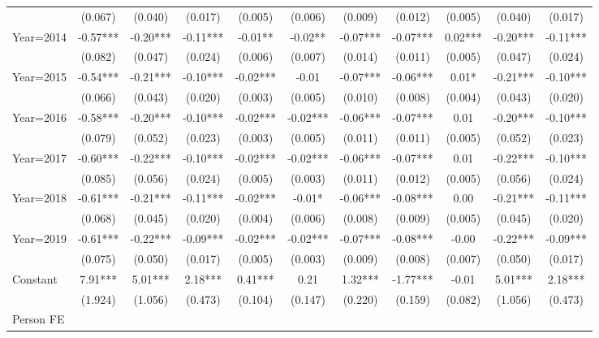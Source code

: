 {\begin{tabular}{l*{10}{c}}
                    &(0.067)   &(0.040)   &(0.017)   &(0.005)   &(0.006)   &(0.009)   &(0.012)   &(0.005)   &(0.040)   &(0.017)   \\
Year=2014           & -0.57***& -0.20***& -0.11***& -0.01** & -0.02** & -0.07***& -0.07***&  0.02***& -0.20***& -0.11***\\
                    &(0.082)   &(0.047)   &(0.024)   &(0.006)   &(0.007)   &(0.014)   &(0.011)   &(0.005)   &(0.047)   &(0.024)   \\
Year=2015           & -0.54***& -0.21***& -0.10***& -0.02***& -0.01   & -0.07***& -0.06***&  0.01*  & -0.21***& -0.10***\\
                    &(0.066)   &(0.043)   &(0.020)   &(0.003)   &(0.005)   &(0.010)   &(0.008)   &(0.004)   &(0.043)   &(0.020)   \\
Year=2016           & -0.58***& -0.20***& -0.10***& -0.02***& -0.02***& -0.06***& -0.07***&  0.01   & -0.20***& -0.10***\\
                    &(0.079)   &(0.052)   &(0.023)   &(0.003)   &(0.005)   &(0.011)   &(0.011)   &(0.005)   &(0.052)   &(0.023)   \\
Year=2017           & -0.60***& -0.22***& -0.10***& -0.02***& -0.02***& -0.06***& -0.07***&  0.01   & -0.22***& -0.10***\\
                    &(0.085)   &(0.056)   &(0.024)   &(0.005)   &(0.003)   &(0.011)   &(0.012)   &(0.005)   &(0.056)   &(0.024)   \\
Year=2018           & -0.61***& -0.21***& -0.11***& -0.02***& -0.01*  & -0.06***& -0.08***&  0.00   & -0.21***& -0.11***\\
                    &(0.068)   &(0.045)   &(0.020)   &(0.004)   &(0.006)   &(0.008)   &(0.009)   &(0.005)   &(0.045)   &(0.020)   \\
Year=2019           & -0.61***& -0.22***& -0.09***& -0.02***& -0.02***& -0.07***& -0.08***& -0.00   & -0.22***& -0.09***\\
                    &(0.075)   &(0.050)   &(0.017)   &(0.005)   &(0.003)   &(0.009)   &(0.008)   &(0.007)   &(0.050)   &(0.017)   \\
Constant            &  7.91***&  5.01***&  2.18***&  0.41***&  0.21   &  1.32***& -1.77***& -0.01   &  5.01***&  2.18***\\
                    &(1.924)   &(1.056)   &(0.473)   &(0.104)   &(0.147)   &(0.220)   &(0.159)   &(0.082)   &(1.056)   &(0.473)   \\
\hline
Person FE           &         &         &         &         &         &         &         &         &         &         \\

\end{tabular}}
